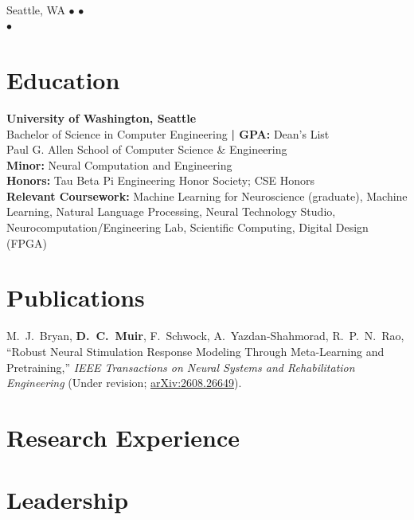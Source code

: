 \documentclass[11pt,a4paper]{article}
\begin{document}
\begin{center}
    {\huge\bfseries \myName} \\[4pt]
    Seattle, WA $\bullet$ \href{mailto:\myEmail}{\myEmail} $\bullet$ \myPhone \\
    \href{https://\myLinkedIn}{\myLinkedIn} $\bullet$
    \href{https://\myGitHub}{\myGitHub}
\end{center}

\vspace{8pt}

\section{Education}
\textbf{University of Washington, Seattle} \hfill \textit{\myGradYear}\\
Bachelor of Science in Computer Engineering \textbf{| GPA: \myGPA} \hfill Dean's List \myDeansList\\
Paul G. Allen School of Computer Science \& Engineering\\
\textbf{Minor:} Neural Computation and Engineering\\
\textbf{Honors:} Tau Beta Pi Engineering Honor Society; CSE Honors\\
\textbf{Relevant Coursework:} Machine Learning for Neuroscience (graduate), Machine Learning, Natural Language Processing, Neural Technology Studio, Neurocomputation/Engineering Lab, Scientific Computing, Digital Design (FPGA)

\vspace{4pt}

\section{Publications}
M.\ J.\ Bryan, \textbf{D.\ C.\ Muir}, F.\ Schwock, A.\ Yazdan-Shahmorad, R.\ P.\ N.\ Rao, ``Robust Neural Stimulation Response Modeling
Through Meta-Learning and Pretraining,'' \textit{IEEE Transactions on Neural Systems and Rehabilitation Engineering} (Under revision; \href{https://arxiv.org/abs/2608.26649}{arXiv:2608.26649}).

\section{Research Experience}


\section{Leadership}

\end{document}
